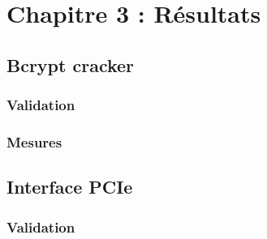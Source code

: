 \chapter{Chapitre 3 : Résultats}


\section{Bcrypt cracker}


\subsection{Validation}

\subsection{Mesures}

\section{Interface PCIe}

\subsection{Validation}